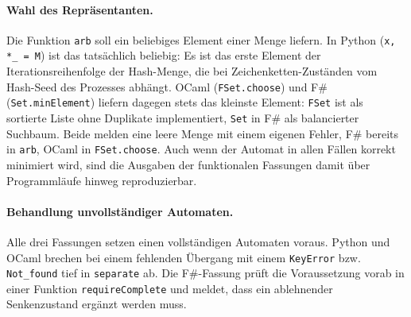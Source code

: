 \paragraph{Wahl des Repräsentanten.}
Die Funktion \texttt{arb} soll ein beliebiges Element einer Menge liefern.
In Python (\texttt{x, *\_ = M}) ist das tatsächlich beliebig: Es ist das erste Element der Iterationsreihenfolge der Hash-Menge, die bei Zeichenketten-Zuständen vom Hash-Seed des Prozesses abhängt.
OCaml (\texttt{FSet.choose}) und F\# (\texttt{Set.minElement}) liefern dagegen stets das kleinste Element: \texttt{FSet} ist als sortierte Liste ohne Duplikate implementiert, \texttt{Set} in F\# als balancierter Suchbaum.
Beide melden eine leere Menge mit einem eigenen Fehler, F\# bereits in \texttt{arb}, OCaml in \texttt{FSet.choose}.
Auch wenn der Automat in allen Fällen korrekt minimiert wird, sind die Ausgaben der funktionalen Fassungen damit über Programmläufe hinweg reproduzierbar.

\paragraph{Behandlung unvollständiger Automaten.}
Alle drei Fassungen setzen einen vollständigen Automaten voraus.
Python und OCaml brechen bei einem fehlenden Übergang mit einem \texttt{KeyError} bzw. \texttt{Not\_found} tief in \texttt{separate} ab.
Die F\#-Fassung prüft die Voraussetzung vorab in einer Funktion \texttt{requireComplete} und meldet, dass ein ablehnender Senkenzustand ergänzt werden muss.

